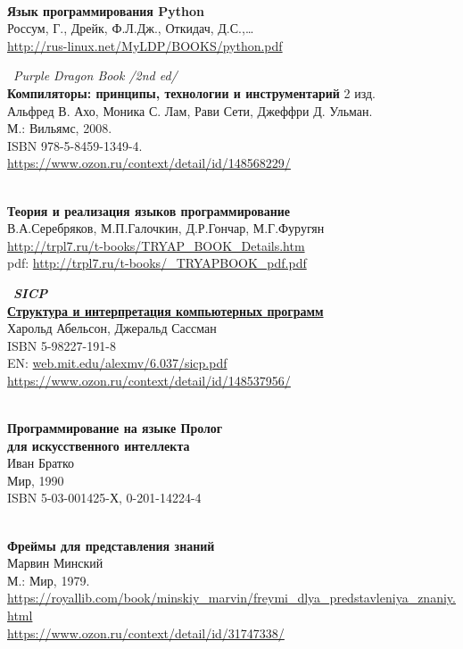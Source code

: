 \begin{thebibliography}{99}

\clearpage
{}\ \\
\textbf{Язык программирования Python}\\
Россум, Г., Дрейк, Ф.Л.Дж., Откидач, Д.С.,\ldots\\
\url{http://rus-linux.net/MyLDP/BOOKS/python.pdf}

\clearpage
{} \ \emph{Purple Dragon Book /2nd ed/}\\
\textbf{Компиляторы: принципы, технологии и инструментарий} 2 изд.\\
Альфред В. Ахо, Моника С. Лам, Рави Сети, Джеффри Д. Ульман.\\
М.: Вильямс, 2008.\\ ISBN 978-5-8459-1349-4.\\
\url{https://www.ozon.ru/context/detail/id/148568229/}

\clearpage
{} \\
\textbf{Теория и реализация языков программирование}\\
В.А.Серебряков, М.П.Галочкин, Д.Р.Гончар, М.Г.Фуругян\\ 
\url{http://trpl7.ru/t-books/TRYAP_BOOK_Details.htm}\\
pdf: \url{http://trpl7.ru/t-books/_TRYAPBOOK_pdf.pdf}

\clearpage
{} \ \textbf{\emph{SICP}\\
\href{https://drive.google.com/file/d/0B0u4WeMjO894X3lnWmhjUktKRk0/view?usp=sharing}{Структура
и интерпретация компьютерных программ}}\\
Харольд Абельсон, Джеральд Сассман\\
ISBN 5-98227-191-8\\
EN: \url{web.mit.edu/alexmv/6.037/sicp.pdf}\\
\url{https://www.ozon.ru/context/detail/id/148537956/}

\clearpage
{}\ \\
\textbf{Программирование на языке Пролог\\для искусственного интеллекта}\\
Иван Братко\\
Мир, 1990\\ ISBN 5-03-001425-Х, 0-201-14224-4

\clearpage
{}\ \\
\textbf{Фреймы для представления знаний}\\
Марвин Минский\\
 М.: Мир, 1979.\\
\url{https://royallib.com/book/minskiy_marvin/freymi_dlya_predstavleniya_znaniy.html}\\
\url{https://www.ozon.ru/context/detail/id/31747338/}


\end{thebibliography}
